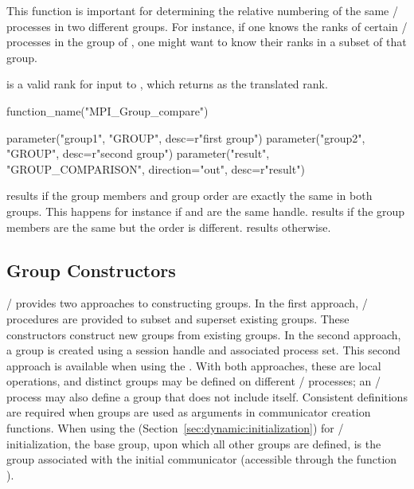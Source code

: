 This function is important for determining the relative numbering of the
same \MPI/ processes in two different groups. For instance, if one knows the
ranks of certain \MPI/ processes in the group of , one might want
to know their ranks in a subset of that group.

 is a valid rank for input to
, which returns
 as the translated rank.

%
\begin{mpi-binding}
    function_name("MPI_Group_compare")
    
    parameter("group1", "GROUP", desc=r"first group")
    parameter("group2", "GROUP", desc=r"second group")
    parameter("result", "GROUP_COMPARISON", direction="out", desc=r"result")
\end{mpi-binding}

\noindent{} results if the group members and group order are
exactly the same in both groups. This happens for instance if
 and  are the same handle.
 results if the group members are the same but the order is
different.  results otherwise.

\subsection{Group Constructors}
\label{subsec:context-grpconst}
\MPI/ provides two approaches to constructing groups.
In the first approach, \MPI/ procedures are provided
to subset and superset existing groups.
These constructors construct new groups from existing groups.
In the second approach, a group is created using a session handle and associated
process set. This second approach is available when using the \spm{}%
\mpitermindex{\spm}.
With both approaches, these are local operations, and distinct groups may be defined on
different \MPI/ processes; an \MPI/ process may also define a group that does not
include itself. Consistent definitions are required when groups are
used as arguments in communicator creation functions.
When using the \wpm{} (Section~\ref{sec:dynamic:initialization}) for \MPI/ initialization\mpitermindex{\wpm},
the base group, upon which all
other groups are defined, is the group associated with the initial
communicator  (accessible through
the function ).

